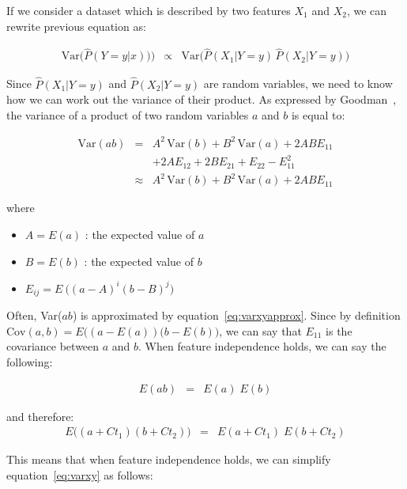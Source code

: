 If we consider a dataset which is described by two features $X_1$ and $X_2$, we can rewrite previous equation as:

\begin{eqnarray}
\mbox{Var}\big(\hat{P}(Y=y|x)\big)) &\propto& \mbox{Var} \big (\hat{P}(X_1|Y=y)\, \hat{P}(X_2|Y=y)\big )\label{eq:nbsimplified}
\end{eqnarray}

Since $\hat{P}(X_1|Y=y)$ and $\hat{P}(X_2|Y=y)$ are random variables, we need to know how we can work out the variance of their product. As expressed by Goodman~\cite{exactvar60}, the variance of a product of two random variables $a$ and $b$ is equal to:

\begin{eqnarray}
\mbox{Var}(ab) &=& A^2\,\mbox{Var}(b) + B^2\,\mbox{Var}(a) + 2ABE_{11} \nonumber \\
&& + 2AE_{12} + 2BE_{21} + E_{22} - E_{11}^2\label{eq:varxy}\\
&\approx& A^2\,\mbox{Var}(b) + B^2\,\mbox{Var}(a) + 2ABE_{11}\label{eq:varxyapprox}
\end{eqnarray}

where 

\begin{itemize}
\item $A = E(a)$ : the expected value of $a$
\item $B = E(b)$ : the expected value of $b$
\item $E_{ij} = E\ \big ((a-A)^i (b-B)^j\big )$
\end{itemize}

Often, Var($ab$) is approximated by equation~\ref{eq:varxyapprox}. Since by definition $\mbox{Cov}(a,b) = E \big ( (a-E(a))(b-E(b) \big )$, we can say that $E_{11}$ is the covariance between $a$ and $b$. When feature independence holds, we can say the following:

\begin{eqnarray}
E(ab) &=& E(a)\;E(b)
\end{eqnarray}

and therefore:
\begin{eqnarray}
E \big ( (a + Ct_1) (b + Ct_2) \big ) &=& E (a + Ct_1)\; E(b + Ct_2)
\end{eqnarray}

This means that when feature independence holds, we can simplify equation~\ref{eq:varxy} as follows:


